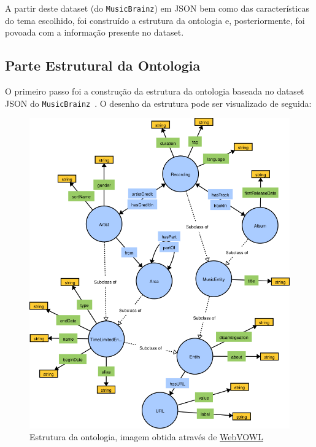 \documentclass{article}
\begin{document}
A partir deste dataset (do \texttt{MusicBrainz}) em JSON bem como das características do tema escolhido, foi construído a estrutura da ontologia e, posteriormente, foi povoada com a informação presente no dataset.

\subsection{Parte Estrutural da Ontologia}

O primeiro passo foi a construção da estrutura da ontologia baseada no dataset JSON do \texttt{MusicBrainz}~\cite{mbSchema}. O desenho da estrutura pode ser visualizado de seguida:

\begin{figure}[H]
    \centering
    \includegraphics[width=15cm]{Pictures/ontologySctructure.png}
    \caption{Estrutura da ontologia, imagem obtida através de \protect\href{http://www.visualdataweb.de/webvowl/}{WebVOWL}}
\end{figure}
\end{document}
